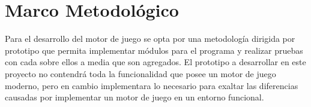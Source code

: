 
\chapter{Marco Metodológico}  %

\ifpdf
    \graphicspath{{metodologia/Figs/Raster/}{metodologia/Figs/PDF/}{metodologia/Figs/}}
\else
    \graphicspath{{metodologia/Figs/Vector/}{metodologia/Figs/}}
\fi

Para el desarrollo del motor de juego se opta por una metodología dirigida por prototipo que permita implementar módulos para el programa y realizar pruebas con cada sobre ellos a media que son agregados. El prototipo a desarrollar en este proyecto no contendrá toda la funcionalidad que posee un motor de juego moderno, pero en cambio implementara lo necesario para exaltar las diferencias causadas por implementar un motor de juego en un entorno funcional.
